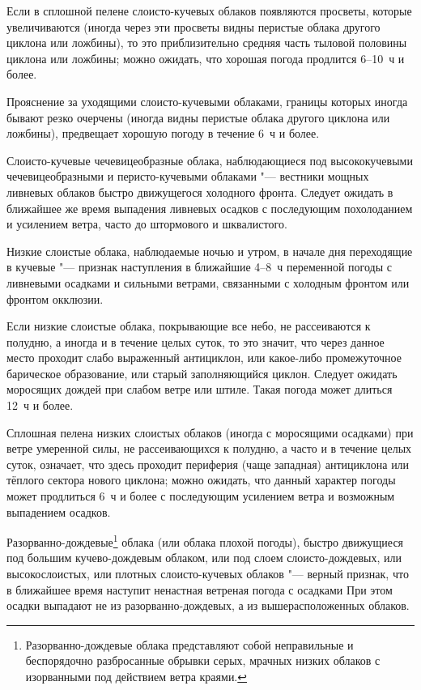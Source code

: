  Если в сплошной пелене слоисто-кучевых облаков появляются
просветы, которые увеличиваются (иногда через эти просветы видны
перистые облака другого циклона или ложбины), то это приблизительно
средняя часть тыловой половины циклона или ложбины; можно ожидать, что
хорошая погода продлится 6--10~ч и более.

 Прояснение за уходящими слоисто-кучевыми облаками, границы
которых иногда бывают резко очерчены (иногда видны перистые облака
другого циклона или ложбины), предвещает хорошую погоду в течение 6~ч
и более.

 Слоисто-кучевые чечевицеобразные облака, наблюдающиеся под
высококучевыми чечевицеобразными и перисто-кучевыми облаками "---
вестники мощных ливневых облаков быстро движущегося холодного
фронта. Следует ожидать в ближайшее же время выпадения ливневых осадков
с последующим похолоданием и усилением ветра, часто до штормового и
шквалистого.

 Низкие слоистые облака, наблюдаемые ночью и утром, в начале дня
переходящие в кучевые "--- признак наступления в ближайшие 4--8~ч
переменной погоды с ливневыми осадками и сильными ветрами, связанными
с холодным фронтом или фронтом окклюзии.

 Если низкие слоистые облака, покрывающие все небо, не
рассеиваются к полудню, а иногда и в течение целых суток, то это
значит, что через данное место проходит слабо выраженный антициклон,
или какое-либо промежуточное барическое образование, или старый
заполняющийся циклон. Следует ожидать моросящих дождей при слабом
ветре или штиле. Такая погода может длиться 12~ч и более.

 Сплошная пелена низких слоистых облаков (иногда с моросящими
осадками) при ветре умеренной силы, не рассеивающихся к полудню, а
часто и в течение целых суток, означает, что здесь проходит периферия
(чаще западная) антициклона или тёплого сектора нового циклона; можно
ожидать, что данный характер погоды может продлиться 6~ч и более с
последующим усилением ветра и возможным выпадением осадков.

 Разорванно-дождевые\footnote{Разорванно-дождевые облака
  представляют собой неправильные и беспорядочно разбросанные обрывки
  серых, мрачных низких облаков с изорванными под действием ветра
  краями.} облака (или облака плохой погоды), быстро движущиеся под
большим кучево-дождевым облаком, или под слоем слоисто-дождевых, или
высокослоистых, или плотных слоисто-кучевых облаков "--- верный
признак, что в ближайшее время наступит ненастная ветреная погода с
осадками При этом осадки выпадают не из разорванно-дождевых, а из
вышерасположенных облаков.

